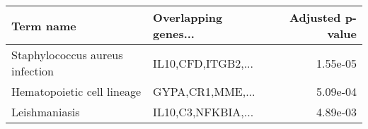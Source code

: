 \begin{tabular}{llr}
\toprule
                      Term name & Overlapping genes... &  Adjusted p-value \\
\midrule
Staphylococcus aureus infection &   IL10,CFD,ITGB2,... &          1.55e-05 \\
     Hematopoietic cell lineage &     GYPA,CR1,MME,... &          5.09e-04 \\
                  Leishmaniasis &   IL10,C3,NFKBIA,... &          4.89e-03 \\
\bottomrule
\end{tabular}

